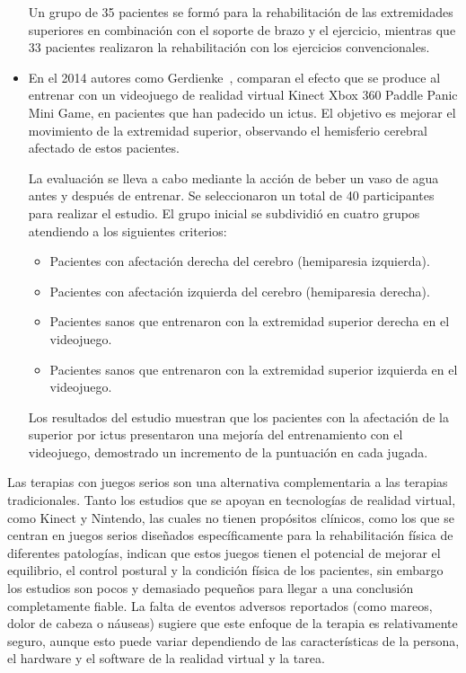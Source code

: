 \begin{itemize}
    Un grupo de 35 pacientes se formó para la rehabilitación de las extremidades superiores en combinación con el soporte de brazo y el ejercicio, mientras que 33 pacientes realizaron la rehabilitación con los ejercicios convencionales.
    
    \item En el 2014  autores como Gerdienke~\cite{10.3233/NRE-141105}, comparan el efecto que se produce al entrenar con un videojuego de realidad virtual Kinect Xbox 360 Paddle Panic Mini Game, en pacientes que han padecido un ictus. El objetivo es mejorar el movimiento de la extremidad superior, observando el hemisferio cerebral afectado de estos pacientes.

    La evaluación se lleva a cabo mediante la acción de beber un vaso de agua antes y después de entrenar. Se seleccionaron un total de 40 participantes para realizar el estudio. El grupo inicial se subdividió en cuatro grupos atendiendo a los siguientes criterios:

    \begin{itemize}
        \item Pacientes con afectación derecha del cerebro (hemiparesia izquierda).
        \item Pacientes con afectación izquierda del cerebro (hemiparesia derecha).
        \item Pacientes sanos que entrenaron con la extremidad superior derecha en el videojuego.
        \item Pacientes sanos que entrenaron con la extremidad superior izquierda en el videojuego.
    \end{itemize}

    Los resultados del estudio muestran que los pacientes con la afectación de la  superior por ictus presentaron una mejoría del entrenamiento con el videojuego, demostrado un incremento de la puntuación en cada jugada.
\end{itemize}

Las terapias con juegos serios son una alternativa complementaria a las terapias tradicionales. Tanto los estudios que se apoyan en tecnologías de realidad virtual, como Kinect y Nintendo, las cuales no tienen propósitos clínicos, como los que se centran en juegos serios diseñados específicamente para la rehabilitación física de diferentes patologías, indican que estos juegos tienen el potencial de mejorar el equilibrio, el control postural y la condición física de los pacientes, sin embargo los estudios son pocos y demasiado pequeños para llegar a una conclusión completamente fiable. La falta de eventos adversos reportados (como mareos, dolor de cabeza o náuseas) sugiere que este enfoque de la terapia es relativamente seguro, aunque esto puede variar dependiendo de las características de la persona, el hardware y el software de la realidad virtual y la tarea. 